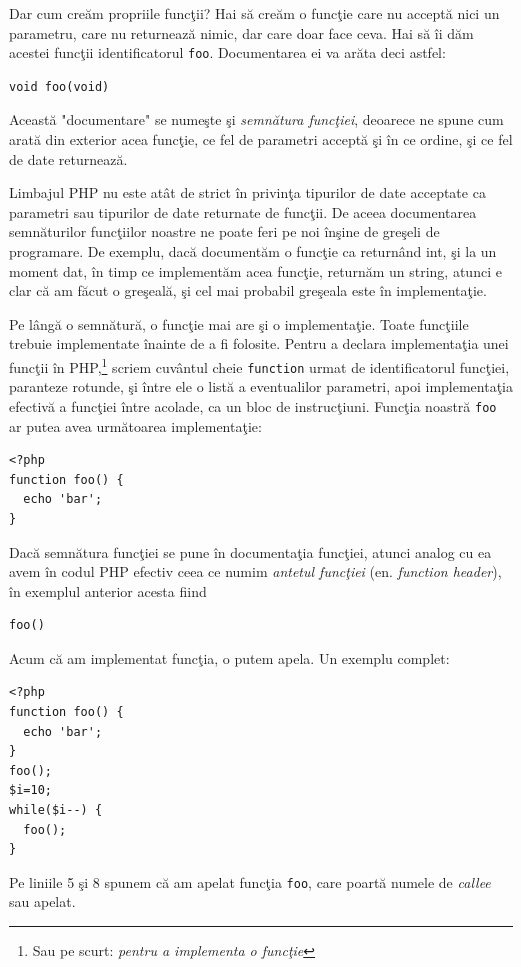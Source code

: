 Dar cum creăm propriile funcţii? Hai să creăm o funcţie care nu acceptă nici un
parametru, care nu returnează nimic, dar care doar face ceva. Hai să îi dăm acestei
funcţii identificatorul \texttt{foo}. Documentarea ei va arăta deci astfel:
\begin{verbatim}
void foo(void)
\end{verbatim}
Această "documentare" se numeşte şi \textsl{semnătura funcţiei}, deoarece
ne spune cum arată din exterior acea funcţie, ce fel de parametri acceptă
şi în ce ordine, şi ce fel de date returnează.

Limbajul PHP nu este at\^at de strict \^in privinţa tipurilor de date
acceptate ca parametri sau tipurilor de date returnate de funcţii. De aceea
documentarea semnăturilor funcţiilor noastre ne poate feri pe noi \^inşine
de greşeli de programare. De exemplu, dacă documentăm o funcţie ca return\^and
{\glqq}int{\grqq}, şi la un moment dat, \^in timp ce implementăm acea funcţie,
returnăm un {\glqq}string{\grqq}, atunci e clar că am făcut o greşeală, şi cel
mai probabil greşeala este \^in implementaţie.





Pe lângă o semnătură, o funcţie mai are şi o implementaţie. Toate funcţiile
trebuie implementate înainte de a fi folosite. Pentru a declara
implementaţia unei funcţii în PHP,\footnote{Sau pe scurt: \textit{pentru
a implementa o funcţie}}
scriem cuvântul cheie \texttt{function} urmat de identificatorul funcţiei,
paranteze rotunde, şi între ele o listă a eventualilor parametri,
apoi implementaţia efectivă a funcţiei între acolade, ca un bloc
de instrucţiuni. Funcţia
noastră \texttt{foo} ar putea avea următoarea implementaţie:
\begin{lstlisting}
<?php
function foo() {
  echo 'bar';
}
\end{lstlisting}
Dacă semnătura funcţiei se pune \^in documentaţia funcţiei, atunci analog cu ea
avem \^in codul PHP efectiv ceea ce numim \textsl{antetul funcţiei} (en. \textsl{function header}),
\^in exemplul anterior acesta fiind
\begin{verbatim}
foo()
\end{verbatim}


Acum că am implementat funcţia, o putem apela. Un exemplu complet:
\begin{lstlisting}
<?php
function foo() {
  echo 'bar';
}
foo();
$i=10;
while($i--) {
  foo();
}
\end{lstlisting}
Pe liniile 5 şi 8 spunem că am apelat funcţia \texttt{foo}, care poartă numele
de \textsl{callee} sau apelat.

